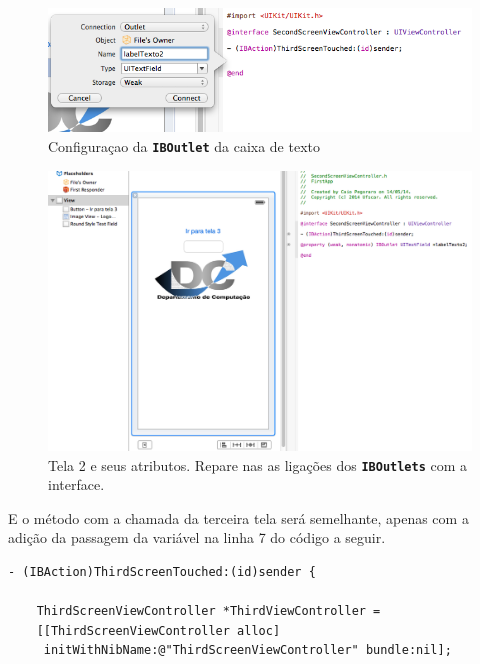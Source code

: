 \documentclass[a4paper,12pt,brazil,doubleside]{book}
\begin{document}
\begin{singlespace}
\begin{figure}[H]
  \centering
  \includegraphics[width=.75\textwidth]{figuras/3/tela_novo_projeto_43.png}
  \caption{Configuraçao da \texttt{\textbf{IBOutlet}} da caixa de texto}
  \label{fig:a}
\end{figure} 

\bigskip
\bigskip

\begin{figure}[H]
  \centering
  \includegraphics[width=.99\textwidth]{figuras/3/tela_novo_projeto_44.png}
  \caption{Tela 2 e seus atributos. Repare nas as ligações dos \texttt{\textbf{IBOutlets}} com a interface.}
  \label{fig:a}
\end{figure}

\bigskip


E o método com a chamada da terceira tela será semelhante, apenas com a adição da passagem da variável na linha 7 do código a seguir.

\begin{listing}[H]
\begin{verbatim}
- (IBAction)ThirdScreenTouched:(id)sender {

    ThirdScreenViewController *ThirdViewController =
    [[ThirdScreenViewController alloc]
     initWithNibName:@"ThirdScreenViewController" bundle:nil];
    

\end{verbatim}
\end{listing}
\end{singlespace}
\end{document}
